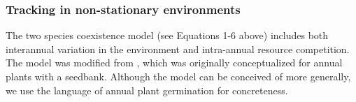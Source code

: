 \documentclass[11pt,letterpaper]{article}
\begin{document}



\subsubsection{Tracking in non-stationary environments}

The two species coexistence model (see Equations 1-6 above) includes both interannual variation in the environment and intra-annual resource competition.  The model was modified from \citet{Chesson:2004eo}, which was originally conceptualized for annual plants with a seedbank.  Although the model can be conceived of more generally, we use the language of annual plant germination for concreteness.  
\end{document}
